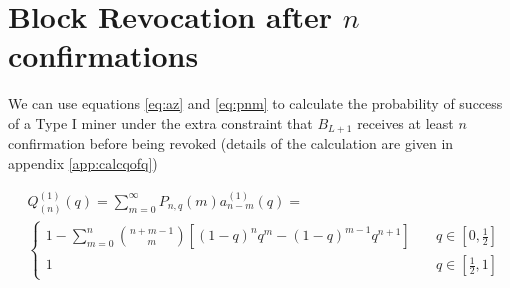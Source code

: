 \documentclass[letterpaper,12pt]{report}
\begin{document}
\noindent%
\begin{minipage}{\linewidth}
\label{fig:PlotProbOfSuccess}
\end{minipage}

\section{Block Revocation after $n$ confirmations}

We can use equations \ref{eq:az} and \ref{eq:pnm} to calculate the probability of success of a Type I miner under the extra constraint that $\mathit{B}_{L+1}$ receives at least $n$ confirmation before being revoked (details of the calculation are given in appendix \ref{app:calcqofq})

\begin{eqnarray}\label{eq:qn}
&\mathit{Q}_{(n)}^{(1)}(q)=\sum_{m=0}^{\infty}\mathit{P}_{n,q}(m)\mathit{a}^{(1)}_{n-m}(q)=\\
&\begin{cases}
1-\sum_{m=0}^n{n + m -1\choose m}\left[(1-q)^nq^m-(1-q)^{m-1}q^{n+1}\right] & \quad q \in [0,\frac{1}{2}] \\
1 & \quad q \in [\frac{1}{2},1] 
\end{cases}
\end{eqnarray}
\end{document}
